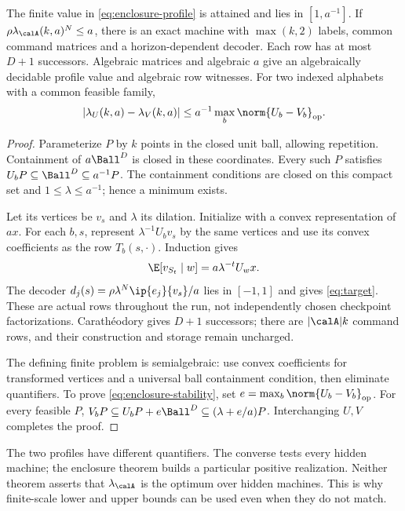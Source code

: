 \begin{theorem}\label{thm:enclosure}
The finite value in \eqref{eq:enclosure-profile} is attained and lies in $[1,a^{-1}]$. If $\rho\lambda_{\calA}(k,a)^N\le a$, there is an exact machine with $\max(k,2)$ labels, common command matrices and a horizon-dependent decoder. Each row has at most $D+1$ successors. Algebraic matrices and algebraic $a$ give an algebraically decidable profile value and algebraic row witnesses. For two indexed alphabets with a common feasible family,
\begin{equation}\label{eq:enclosure-stability}
 |\lambda_U(k,a)-\lambda_V(k,a)|
                \le a^{-1}\max_b\norm{U_b-V_b}_{\mathrm{op}}.
\end{equation}
\end{theorem}
\begin{proof}
Parameterize $P$ by $k$ points in the closed unit ball, allowing repetition. Containment of $a\Ball^D$ is closed in these coordinates. Every such $P$ satisfies $U_bP\subseteq\Ball^D\subseteq a^{-1}P$. The containment conditions are closed on this compact set and $1\le\lambda\le a^{-1}$; hence a minimum exists.

Let its vertices be $v_s$ and $\lambda$ its dilation. Initialize with a convex representation of $ax$. For each $b,s$, represent $\lambda^{-1}U_bv_s$ by the same vertices and use its convex coefficients as the row $T_b(s,\cdot)$. Induction gives
\[
                   \E[v_{S_t}\mid w]=a\lambda^{-t}U_wx.
\]
The decoder $d_j(s)=\rho\lambda^N\ip{e_j}{v_s}/a$ lies in $[-1,1]$ and gives \eqref{eq:target}. These are actual rows throughout the run, not independently chosen checkpoint factorizations. Carath\'eodory gives $D+1$ successors; there are $|\calA|k$ command rows, and their construction and storage remain uncharged.

The defining finite problem is semialgebraic: use convex coefficients for transformed vertices and a universal ball containment condition, then eliminate quantifiers. To prove \eqref{eq:enclosure-stability}, set $e=\max_b\norm{U_b-V_b}_{\mathrm{op}}$. For every feasible $P$,
$V_bP\subseteq U_bP+e\Ball^D\subseteq(\lambda+e/a)P$.
Interchanging $U,V$ completes the proof.
\end{proof}

The two profiles have different quantifiers. The converse tests every hidden machine; the enclosure theorem builds a particular positive realization. Neither theorem asserts that $\lambda_{\calA}$ is the optimum over hidden machines. This is why finite-scale lower and upper bounds can be used even when they do not match.

